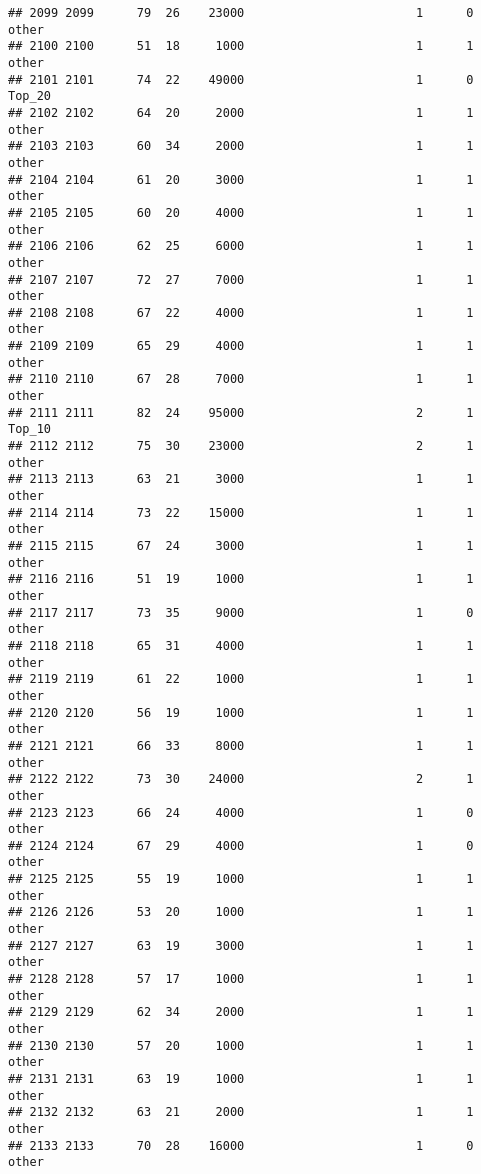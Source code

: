 \documentclass[
]{article}
\begin{document}
\begin{verbatim}
## 2099 2099      79  26    23000                        1      0    other
## 2100 2100      51  18     1000                        1      1    other
## 2101 2101      74  22    49000                        1      0   Top_20
## 2102 2102      64  20     2000                        1      1    other
## 2103 2103      60  34     2000                        1      1    other
## 2104 2104      61  20     3000                        1      1    other
## 2105 2105      60  20     4000                        1      1    other
## 2106 2106      62  25     6000                        1      1    other
## 2107 2107      72  27     7000                        1      1    other
## 2108 2108      67  22     4000                        1      1    other
## 2109 2109      65  29     4000                        1      1    other
## 2110 2110      67  28     7000                        1      1    other
## 2111 2111      82  24    95000                        2      1   Top_10
## 2112 2112      75  30    23000                        2      1    other
## 2113 2113      63  21     3000                        1      1    other
## 2114 2114      73  22    15000                        1      1    other
## 2115 2115      67  24     3000                        1      1    other
## 2116 2116      51  19     1000                        1      1    other
## 2117 2117      73  35     9000                        1      0    other
## 2118 2118      65  31     4000                        1      1    other
## 2119 2119      61  22     1000                        1      1    other
## 2120 2120      56  19     1000                        1      1    other
## 2121 2121      66  33     8000                        1      1    other
## 2122 2122      73  30    24000                        2      1    other
## 2123 2123      66  24     4000                        1      0    other
## 2124 2124      67  29     4000                        1      0    other
## 2125 2125      55  19     1000                        1      1    other
## 2126 2126      53  20     1000                        1      1    other
## 2127 2127      63  19     3000                        1      1    other
## 2128 2128      57  17     1000                        1      1    other
## 2129 2129      62  34     2000                        1      1    other
## 2130 2130      57  20     1000                        1      1    other
## 2131 2131      63  19     1000                        1      1    other
## 2132 2132      63  21     2000                        1      1    other
## 2133 2133      70  28    16000                        1      0    other

\end{verbatim}
\end{document}
